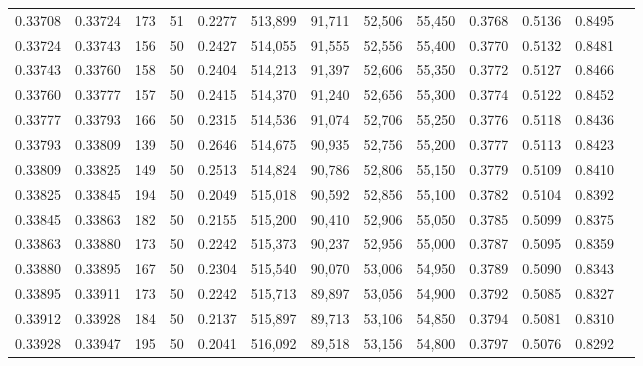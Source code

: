 \begin{tabular}{rrrrrrrrrrrrr}
0.33708 & 0.33724 &   173 &  51 &                                     0.2277 & 513,899 &  91,711 &  52,506 &  55,450 & 0.3768 & 0.5136 & 0.8495 \\
0.33724 & 0.33743 &   156 &  50 &                                     0.2427 & 514,055 &  91,555 &  52,556 &  55,400 & 0.3770 & 0.5132 & 0.8481 \\
0.33743 & 0.33760 &   158 &  50 &                                     0.2404 & 514,213 &  91,397 &  52,606 &  55,350 & 0.3772 & 0.5127 & 0.8466 \\
0.33760 & 0.33777 &   157 &  50 &                                     0.2415 & 514,370 &  91,240 &  52,656 &  55,300 & 0.3774 & 0.5122 & 0.8452 \\
0.33777 & 0.33793 &   166 &  50 &                                     0.2315 & 514,536 &  91,074 &  52,706 &  55,250 & 0.3776 & 0.5118 & 0.8436 \\
0.33793 & 0.33809 &   139 &  50 &                                     0.2646 & 514,675 &  90,935 &  52,756 &  55,200 & 0.3777 & 0.5113 & 0.8423 \\
0.33809 & 0.33825 &   149 &  50 &                                     0.2513 & 514,824 &  90,786 &  52,806 &  55,150 & 0.3779 & 0.5109 & 0.8410 \\
0.33825 & 0.33845 &   194 &  50 &                                     0.2049 & 515,018 &  90,592 &  52,856 &  55,100 & 0.3782 & 0.5104 & 0.8392 \\
0.33845 & 0.33863 &   182 &  50 &                                     0.2155 & 515,200 &  90,410 &  52,906 &  55,050 & 0.3785 & 0.5099 & 0.8375 \\
0.33863 & 0.33880 &   173 &  50 &                                     0.2242 & 515,373 &  90,237 &  52,956 &  55,000 & 0.3787 & 0.5095 & 0.8359 \\
0.33880 & 0.33895 &   167 &  50 &                                     0.2304 & 515,540 &  90,070 &  53,006 &  54,950 & 0.3789 & 0.5090 & 0.8343 \\
0.33895 & 0.33911 &   173 &  50 &                                     0.2242 & 515,713 &  89,897 &  53,056 &  54,900 & 0.3792 & 0.5085 & 0.8327 \\
0.33912 & 0.33928 &   184 &  50 &                                     0.2137 & 515,897 &  89,713 &  53,106 &  54,850 & 0.3794 & 0.5081 & 0.8310 \\
0.33928 & 0.33947 &   195 &  50 &                                     0.2041 & 516,092 &  89,518 &  53,156 &  54,800 & 0.3797 & 0.5076 & 0.8292 \\

\end{tabular}

